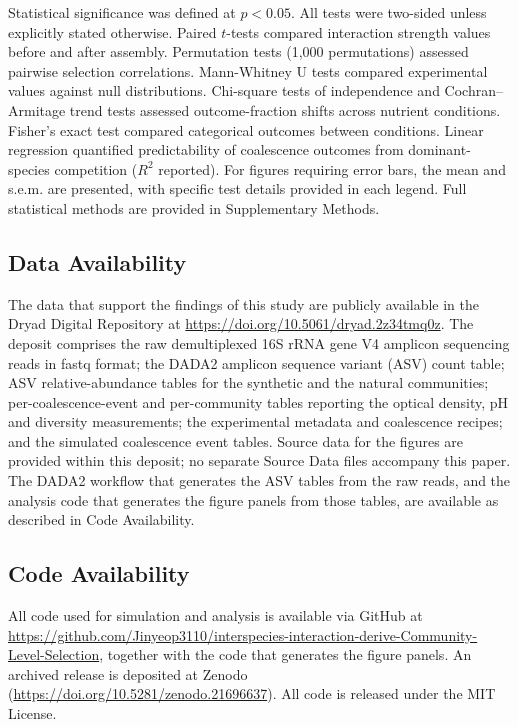 Statistical significance was defined at $p < 0.05$. All tests were two-sided unless explicitly stated otherwise. Paired $t$-tests compared interaction strength values before and after assembly. Permutation tests (1,000 permutations) assessed pairwise selection correlations. Mann-Whitney U tests compared experimental values against null distributions. Chi-square tests of independence and Cochran--Armitage trend tests assessed outcome-fraction shifts across nutrient conditions. Fisher's exact test compared categorical outcomes between conditions. Linear regression quantified predictability of coalescence outcomes from dominant-species competition ($R^2$ reported). For figures requiring error bars, the mean and s.e.m. are presented, with specific test details provided in each legend. Full statistical methods are provided in Supplementary Methods.


\subsection*{Data Availability}
\label{sec:methods:data}

The data that support the findings of this study are publicly available in the Dryad Digital Repository at \href{https://doi.org/10.5061/dryad.2z34tmq0z}{https://doi.org/10.5061/dryad.2z34tmq0z}\citep{SongDryad2026}. The deposit comprises the raw demultiplexed 16S rRNA gene V4 amplicon sequencing reads in fastq format; the DADA2 amplicon sequence variant (ASV) count table; ASV relative-abundance tables for the synthetic and the natural communities; per-coalescence-event and per-community tables reporting the optical density, pH and diversity measurements; the experimental metadata and coalescence recipes; and the simulated coalescence event tables. Source data for the figures are provided within this deposit; no separate Source Data files accompany this paper. The DADA2 workflow that generates the ASV tables from the raw reads, and the analysis code that generates the figure panels from those tables, are available as described in Code Availability.


\subsection*{Code Availability}
\label{sec:methods:code}

All code used for simulation and analysis is available via GitHub at \url{https://github.com/Jinyeop3110/interspecies-interaction-derive-Community-Level-Selection}, together with the code that generates the figure panels. An archived release is deposited at Zenodo (\href{https://doi.org/10.5281/zenodo.21696637}{https://doi.org/10.5281/zenodo.21696637})\citep{SongZenodo2026}. All code is released under the MIT License.


